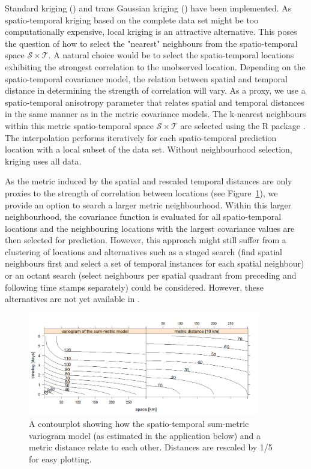 Standard kriging () and trans Gaussian kriging () have been implemented. As spatio-temporal kriging based on the complete data set might be too computationally expensive, local kriging is an attractive alternative. This poses the question of how to select the "nearest" neighbours from the spatio-temporal space $\mathcal{S}\times\mathcal{T}$. A natural choice would be to select the spatio-temporal locations exhibiting the strongest correlation to the unobserved location. Depending on the spatio-temporal covariance model, the relation between spatial and temporal distance in determining the strength of correlation will vary. As a proxy, we use a spatio-temporal anisotropy parameter that relates spatial and temporal distances in the same manner as in the metric covariance models. The k-nearest neighbours within this metric spatio-temporal space $\mathcal{S}\times\mathcal{T}$ are selected using the R package  \citep{Beygelzimer2013}. The interpolation performs iteratively for each spatio-temporal prediction location with a local subset of the data set. Without neighbourhood selection, kriging uses all data.

As the metric induced by the spatial and rescaled temporal distances are only proxies to the strength of correlation between locations (see Figure~\ref{fig:vgmVsDist}), we provide an option to search a larger metric neighbourhood. Within this larger neighbourhood, the covariance function is evaluated for all spatio-temporal locations and the neighbouring locations with the largest covariance values are then selected for prediction. However, this approach might still suffer from a clustering of locations and alternatives such as a staged search (find spatial neighbours first and select a set of temporal instances for each spatial neighbour) or an octant search (select neighbours per spatial quadrant from preceding and following time stamps separately) could be considered. However, these alternatives are not yet available in . 

\begin{figure}
\centering
\includegraphics[width=0.9\textwidth]{vgmVsMetricDist.png}
\caption{A contourplot showing how the spatio-temporal sum-metric variogram model (as estimated in the application below) and a metric distance relate to each other. Distances are rescaled by 1/5 for easy plotting.}\label{fig:vgmVsDist}
\end{figure}

